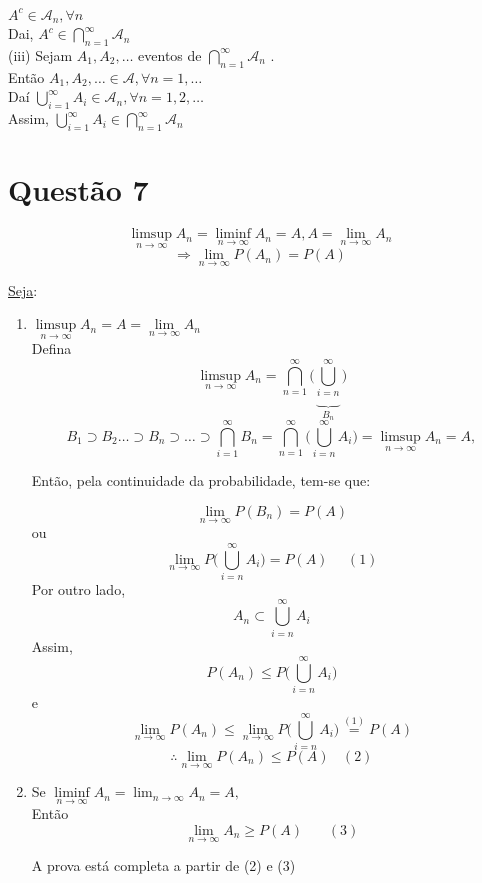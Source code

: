 \documentclass[a4paper,12pt]{report}
\begin{document}
\begin{enumerate}[label=\alph*)]
		\\
		$A^c \in \mathscr{A}_n,\forall n$\\
		Dai, $A^c \in \bigcap\limits_{n=1}^\infty \mathscr{A}_n$ \\
		(iii) Sejam $A_1,A_2,\ldots$ eventos de $\bigcap\limits_{n=1}^\infty \mathscr{A}_n$ .\\
		Então $A_1,A_2,\ldots \in \mathscr{A}, \forall n=1,\ldots$\\
		Daí   $\bigcup\limits_{i=1}^\infty A_i\in \mathscr{A}_n, \forall n=1,2,\ldots$\\
		Assim,  $\bigcup\limits_{i=1}^\infty A_i\in \bigcap\limits_{n=1}^\infty \mathscr{A}_n$\\
		 \end{enumerate} 
		


	

	\section{Questão 7}
	
$$	\limsup\limits_{n\rightarrow \infty} A_n =\liminf\limits_{n\rightarrow \infty} A_n =A,A=\lim\limits_{n\rightarrow \infty} A_n $$
$$\Rightarrow \lim\limits_{n\rightarrow \infty}P(A_n)=P(A)  $$	

\underline{Seja}:
\begin{enumerate}[label=\alph*)]
	\item $\limsup\limits_{n\rightarrow \infty} A_n =A=\lim\limits_{n\rightarrow \infty} A_n  $\\
	Defina
	$$\limsup\limits_{n\rightarrow \infty} A_n = \bigcap\limits_{n=1}^\infty \bigg( \underbrace{\bigcup\limits_{i=n}^{\infty}}_{B_n}\bigg) $$
	$$B_1\supset B_2 \ldots \supset B_n \supset \ldots \supset \bigcap\limits_{i=1}^{\infty}B_n= \bigcap\limits_{n=1}^\infty\bigg(\bigcup\limits_{i=n}^\infty A_i\bigg)=\limsup\limits_{n\rightarrow \infty} A_n=A,$$
	
	Então, pela continuidade da probabilidade, tem-se que:
	
	$$\displaystyle{\lim_{n \to \infty}}  P(B_n)=P(A) $$
	ou 
		$$\displaystyle{\lim_{n \to \infty}}  P\bigg(\bigcup\limits_{i=n}^\infty A_i\bigg)=P(A) \ \ \ \ \ \ (1)$$
		Por outro lado,
		$$A_n \subset  \bigcup\limits_{i=n}^\infty A_i$$
		Assim, 
		$$P(A_n)\le  P\bigg(\bigcup\limits_{i=n}^\infty A_i \bigg)$$
		e 
		$$\displaystyle{\lim_{n \to \infty}} P(A_n)\le \displaystyle{\lim_{n \to \infty}} P\bigg(\bigcup\limits_{i=n}^\infty A_i \bigg) \overset{(1)}{=} P(A)  $$
		$$\therefore \displaystyle{\lim_{n \to \infty}} P(A_n)\le P(A) \ \ \ \ (2) $$
		
		\item Se $\liminf\limits_{n\rightarrow \infty} A_n = \displaystyle{\lim_{n \to \infty}} A_n=A,$\\
		Então 
		$$ \displaystyle{\lim_{n \to \infty}} A_n \ge P(A) \ \ \ \ \ \ \ \ (3)$$
		
		A prova está completa a partir de (2) e (3)
	
\end{enumerate}
\newpage
\end{document}
